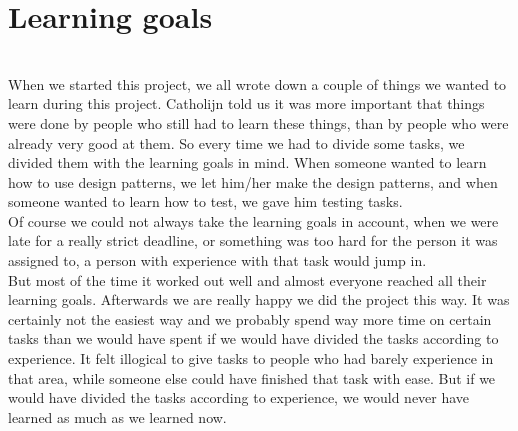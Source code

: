 \documentclass{article}
\begin{document}
\section{Learning goals}
\\

When we started this project, we all wrote down a couple of things we wanted to learn during this project. Catholijn told us it was more important that things were done by people who still had to learn these things, than by people who were already very good at them. So every time we had to divide some tasks, we divided them with the learning goals in mind. When someone wanted to learn how to use design patterns, we let him/her make the design patterns, and when someone wanted to learn how to test, we gave him testing tasks. \\
Of course we could not always take the learning goals in account, when we were late for a really strict deadline, or something was too hard for the person it was assigned to, a person with experience with that task would jump in.\\
But most of the time it worked out well and almost everyone reached all their learning goals. Afterwards we are really happy we did the project this way. It was certainly not the easiest way and we probably spend way more time on certain tasks than we would have spent if we would have divided the tasks according to experience. It felt illogical to give tasks to people who had barely experience in that area, while someone else could have finished that task with ease. But if we would have divided the tasks according to experience, we would never have learned as much as we learned now.    
\end{document}
